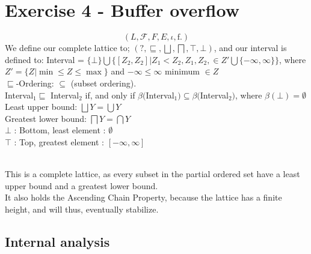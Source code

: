 \documentclass[12pt]{article}
\begin{document}
\section*{Exercise 4 - Buffer overflow}
\begin{equation}
  \left(L, \mathcal{F}, F, E, \iota, \mathrm{f}.  \right)
  \label{eq:monotone_framework}
\end{equation}
We define our complete lattice to; $(?,\sqsubseteq,\bigsqcup, \bigsqcap, \top, \bot )$, and our interval is defined to: Interval = $\{\bot\} \bigcup \{[Z_2, Z_2] | Z_1 < Z_2, Z_1, Z_2, \in Z' \bigcup \{- \infty, \infty \} \} $, where $Z' = \{ Z | \min \leq Z \leq \max \}$ and $ - \infty \leq \infty $ minimum $ \in Z$\\
$\sqsubseteq$-Ordering: $\subseteq$ (subset ordering).\\
Interval$_1 \sqsubseteq $ Interval$_2 $ if, and only if $\beta($Interval$_1) \subseteq \beta($Interval$_2)$, where $\beta(\bot) = \emptyset$\\
Least upper bound: $\bigsqcup Y = \bigcup Y$\\
Greatest lower bound: $\bigsqcap Y = \bigcap Y$\\
$\bot$ : Bottom, least element : $\emptyset$\\
$\top$ : Top, greatest element : $[-\infty, \infty]$\\\

This is a complete lattice, as every subset in the partial ordered set have a least upper bound and a greatest lower bound.\\
It also holds the Ascending Chain Property, because the lattice has a finite height, and will thus, eventually stabilize.


\subsection*{Internal analysis}
\end{document}
